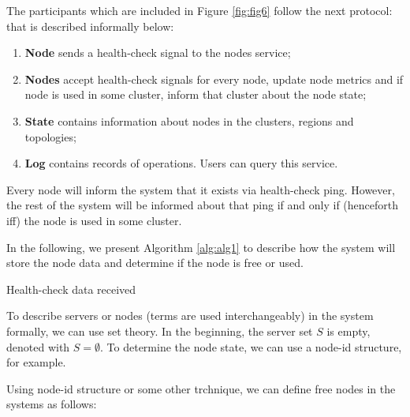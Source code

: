 The participants which are included in Figure \ref{fig:fig6} follow the next protocol:\label{informal_description_health-check} that is described informally below:

\begin{enumerate}[start=1,label={(\bfseries \arabic*)}]
	\item \textbf{Node} sends a health-check signal to the nodes service;
	\item \textbf{Nodes} accept health-check signals for every node, update node metrics and if node is used in some cluster, inform that cluster about the node state;
	\item \textbf{State} contains information about nodes in the clusters, regions and topologies;
	\item \textbf{Log} contains records of operations. Users can query this service. 
\end{enumerate}

Every node will inform the system that it exists via health-check ping. However, the rest of the system will be informed about that ping if and only if (henceforth iff) the node is used in some cluster. 

In the following, we present Algorithm \ref{alg:alg1} to describe how the system will store the node data and determine if the node is free or used.

\begin{algorithm}[H]
	\SetAlgoLined
	\caption{Health-check data received}
	\label{alg:alg1}
\end{algorithm}

To describe servers or nodes (terms are used interchangeably) in the system formally, we can use set theory. In the beginning, the server set $S$ is empty, denoted with $S=\emptyset$. To determine the node state, we can use a node-id structure, for example. 

Using node-id structure or some other trchnique, we can define free nodes in the systems as follows:

